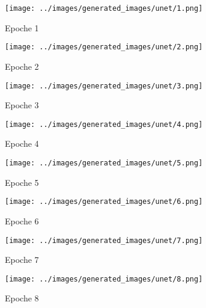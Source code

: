 \begin{figure}[H]
  \centering
 \captionsetup[subfigure]{labelformat=empty}
  \begin{subfigure}[b]{0.1\textwidth}
      \centering
      \texttt{[image: ../images/generated\_images/unet/1.png]}
      \caption{Epoche 1}
  \end{subfigure}
  \hspace{1em}%
  \begin{subfigure}[b]{0.1\textwidth}
      \centering
      \texttt{[image: ../images/generated\_images/unet/2.png]}
      \caption{Epoche 2}
  \end{subfigure}
  \hspace{1em}%
  \begin{subfigure}[b]{0.1\textwidth}
      \centering
      \texttt{[image: ../images/generated\_images/unet/3.png]}
      \caption{Epoche 3}
  \end{subfigure}
  \hspace{1em}%
  \begin{subfigure}[b]{0.1\textwidth}
   \centering
   \texttt{[image: ../images/generated\_images/unet/4.png]}
   \caption{Epoche 4}
 \end{subfigure}
 \hspace{1em}%
 \begin{subfigure}[b]{0.1\textwidth}
   \centering
   \texttt{[image: ../images/generated\_images/unet/5.png]}
   \caption{Epoche 5}
 \end{subfigure}
 \hspace{1em}%
 \begin{subfigure}[b]{0.1\textwidth}
   \centering
   \texttt{[image: ../images/generated\_images/unet/6.png]}
   \caption{Epoche 6}
 \end{subfigure}
 \hspace{1em}%
 \begin{subfigure}[b]{0.1\textwidth}
   \centering
   \texttt{[image: ../images/generated\_images/unet/7.png]}
   \caption{Epoche 7}
 \end{subfigure}
 \hspace{1em}%
 \begin{subfigure}[b]{0.1\textwidth}
 \centering
 \texttt{[image: ../images/generated\_images/unet/8.png]}
 \caption{Epoche 8}
 \end{subfigure}
 \hspace{1em}%
 \begin{subfigure}[b]{0.1\textwidth}

\end{subfigure}
\end{figure}
